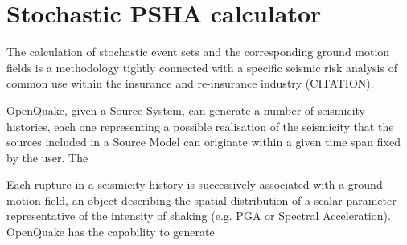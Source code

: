 \section{Stochastic PSHA calculator}
\label{chap:stochastic_psha}
%
The calculation of stochastic event sets  and the corresponding ground motion fields is a methodology tightly connected with a specific seismic risk analysis of common use within the insurance and re-insurance industry (CITATION). 

OpenQuake, given a Source System, can generate a number of seismicity histories, each one representing a possible realisation of the seismicity that the sources included in a Source Model can originate within a given time span fixed by the user.
% 
The 

Each rupture in a seismicity history is successively associated with a ground motion field, an object describing the spatial distribution of a scalar parameter representative of the intensity of shaking (e.g. PGA or Spectral Acceleration). OpenQuake has the capability to generate 
%
